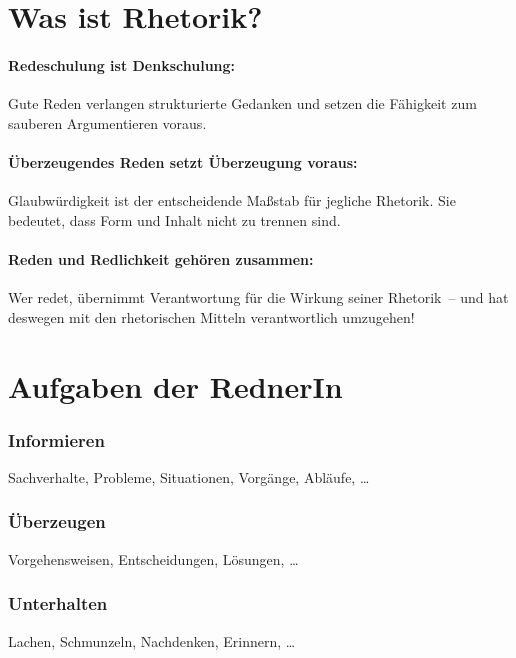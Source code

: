 \section{Was ist Rhetorik?}
\label{was-ist-rhetorik}

\paragraph*{Redeschulung ist Denkschulung:} Gute Reden verlangen strukturierte Gedanken und setzen die Fähigkeit zum sauberen Argumentieren voraus.

\paragraph*{Überzeugendes Reden setzt Überzeugung voraus:} Glaubwürdigkeit ist der entscheidende Maßstab für jegliche Rhetorik. Sie bedeutet, dass Form und Inhalt nicht zu trennen sind.

\paragraph*{Reden und Redlichkeit gehören zusammen:} Wer redet, übernimmt Verantwortung für die Wirkung seiner Rhetorik~-- und hat deswegen mit den rhetorischen Mitteln verantwortlich umzugehen!


\section{Aufgaben der RednerIn}

\subsubsection{Informieren}
Sachverhalte, Probleme, Situationen, Vorgänge, Abläufe, \ldots

\subsubsection{Überzeugen}
Vorgehensweisen, Entscheidungen, Lösungen, \ldots

\subsubsection{Unterhalten}
Lachen, Schmunzeln, Nachdenken, Erinnern, \ldots
